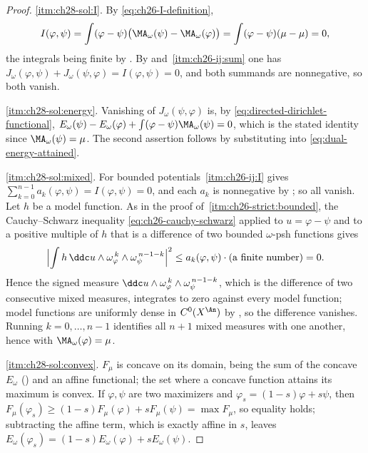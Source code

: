 \begin{proof}
\cref{itm:ch28-sol:I}.  By \eqref{eq:ch26-I-definition},
\[
 I(\varphi,\psi)=\int(\varphi-\psi)
   \bigl(\MA_\omega(\psi)-\MA_\omega(\varphi)\bigr)
 =\int(\varphi-\psi)(\mu-\mu)=0 ,
\]
the integrals being finite by .  By
 and
\,\cref{itm:ch26-ij:sum} one has
\(J_\omega(\varphi,\psi)+J_\omega(\psi,\varphi)=I(\varphi,\psi)=0\), and
both summands are nonnegative, so both vanish.

\cref{itm:ch28-sol:energy}.  Vanishing of \(J_\omega(\psi,\varphi)\) is,
by \eqref{eq:directed-dirichlet-functional},
\(E_\omega(\psi)-E_\omega(\varphi)+\int(\varphi-\psi)\MA_\omega(\psi)=0\),
which is the stated identity since \(\MA_\omega(\psi)=\mu\).  The second
assertion follows by substituting into \eqref{eq:dual-energy-attained}.

\cref{itm:ch28-sol:mixed}.  For bounded potentials
\,\cref{itm:ch26-ij:I} gives
\(\sum_{k=0}^{n-1}a_k(\varphi,\psi)=I(\varphi,\psi)=0\), and each \(a_k\) is
nonnegative by ; so all vanish.  Let
\(h\) be a model function.  As in the proof of
\,\cref{itm:ch26-strict:bounded}, the
Cauchy--Schwarz inequality \eqref{eq:ch26-cauchy-schwarz} applied to
\(u=\varphi-\psi\) and to a positive multiple of \(h\) that is a difference
of two bounded \(\omega\)-psh functions gives
\[
 \Bigl|\int h\,\ddc u\wedge
   \omega_\varphi^{\,k}\wedge\omega_\psi^{\,n-1-k}\Bigr|^2
 \leq a_k(\varphi,\psi)\cdot(\text{a finite number})=0 .
\]
Hence the signed measure
\(\ddc u\wedge\omega_\varphi^{\,k}\wedge\omega_\psi^{\,n-1-k}\), which is
the difference of two consecutive mixed measures, integrates to zero against
every model function; model functions are uniformly dense in
\(C^0(X^{\An})\) by , so the difference vanishes.
Running \(k=0,\ldots,n-1\) identifies all \(n+1\) mixed measures with one
another, hence with \(\MA_\omega(\varphi)=\mu\).

\cref{itm:ch28-sol:convex}.  \(F_\mu\) is concave on its domain, being the
sum of the concave \(E_\omega\) () and an
affine functional; the set where a concave function attains its maximum is
convex.  If \(\varphi,\psi\) are two maximizers and
\(\varphi_s=(1-s)\varphi+s\psi\), then
\(F_\mu(\varphi_s)\geq(1-s)F_\mu(\varphi)+sF_\mu(\psi)=\max F_\mu\), so
equality holds; subtracting the affine term, which is exactly affine in
\(s\), leaves
\(E_\omega(\varphi_s)=(1-s)E_\omega(\varphi)+sE_\omega(\psi)\).


\end{proof}
